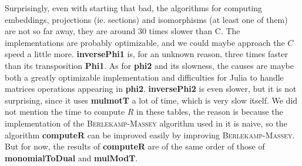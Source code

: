 \documentclass[a4paper,11pt]{article}
\theoremstyle{break}
\theoremstyle{definition}
\theoremstyle{remark}
\begin{document}
Surprisingly, even with starting that bad, the algorithms for computing 
embeddings, projections (ie. sections) and isomorphisms (at least one of them) 
are not so far away, they are around $30$ times slower than C. The 
implementations are probably optimizable, and we could maybe approach the $C$ 
speed a little more. \textbf{inversePhi1} is, for an unknown 
reason, three times faster than its transposition \textbf{Phi1}. As for 
\textbf{phi2} and its slowness, the causes are maybe both a greatly optimizable 
implementation and difficulties for Julia to handle matrices operations 
appearing in \textbf{phi2}. \textbf{inversePhi2} is even slower, but it is not 
surprising, since it uses \textbf{mulmotT} a lot of time, which is very slow 
itself. We did not mention the time to compute $R$ in these tables, the reason 
is because the implementation of the \textsc{Berlekamp-Massey} algorithm used 
in it is naive, so the algorithm \textbf{computeR} can be improved easily by 
improving \textsc{Berlekamp-Massey}. But for now, the results of 
\textbf{computeR} 
are of the same order of those of \textbf{monomialToDual} and \textbf{mulModT}.
\end{document}
